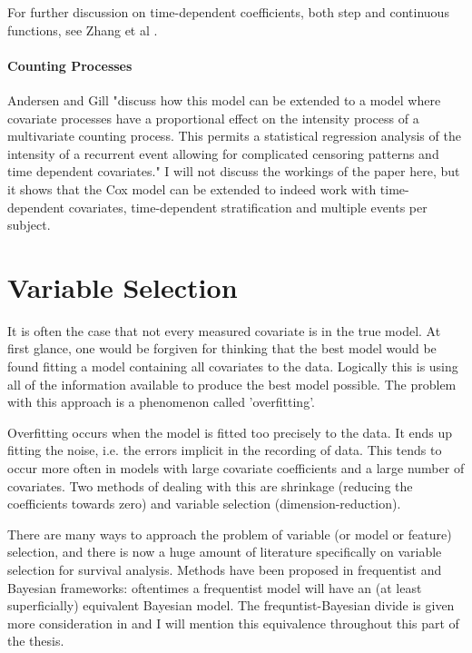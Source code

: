 For further discussion on time-dependent coefficients, both step and continuous functions, see Zhang et al .

\subsection{Counting Processes}

Andersen and Gill  "discuss how this model can be extended to a model where covariate processes have a proportional effect on the intensity process of a multivariate counting process. This permits a statistical regression analysis of the intensity of a recurrent event allowing for complicated censoring patterns and time dependent covariates." I will not discuss the workings of the paper here, but it shows that the Cox model can be extended to indeed work with time-dependent covariates, time-dependent stratification and multiple events per subject. 

\newpage
\part{Variable Selection}\label{prt:variable-selection}

It is often the case that not every measured covariate is in the true model. At first glance, one would be forgiven for thinking that the best model would be found fitting a model containing all covariates to the data. Logically this is using all of the information available to produce the best model possible. The problem with this approach is a phenomenon called 'overfitting'.

Overfitting occurs when the model is fitted too precisely to the data. It ends up fitting the noise, i.e. the errors implicit in the recording of data. This tends to occur more often in models with large covariate coefficients and a large number of covariates. Two methods of dealing with this are shrinkage (reducing the coefficients towards zero) and variable selection (dimension-reduction).

There are many ways to approach the problem of variable (or model or feature) selection, and there is now a huge amount of literature specifically on variable selection for survival analysis. Methods have been proposed in frequentist and Bayesian frameworks: oftentimes a frequentist model will have an (at least superficially) equivalent Bayesian model. The frequntist-Bayesian divide is given more consideration in  and I will mention this equivalence throughout this part of the thesis.

